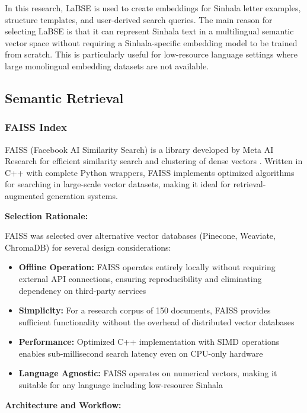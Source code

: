 \documentclass[12pt]{uomthesis}
\begin{document}
In this research, LaBSE is used to create embeddings for Sinhala letter examples, structure templates, and user-derived search queries. The main reason for selecting LaBSE is that it can represent Sinhala text in a multilingual semantic vector space without requiring a Sinhala-specific embedding model to be trained from scratch. This is particularly useful for low-resource language settings where large monolingual embedding datasets are not available.

\subsection{Semantic Retrieval}

\subsubsection{FAISS Index}

FAISS (Facebook AI Similarity Search) is a library developed by Meta AI Research for efficient similarity search and clustering of dense vectors \cite{johnson2019billion}. Written in C++ with complete Python wrappers, FAISS implements optimized algorithms for searching in large-scale vector datasets, making it ideal for retrieval-augmented generation systems.

\textbf{Selection Rationale:}

FAISS was selected over alternative vector databases (Pinecone, Weaviate, ChromaDB) \cite{pan2023vector} for several design considerations:

\begin{itemize}
    \item \textbf{Offline Operation:} FAISS operates entirely locally without requiring external API connections, ensuring reproducibility and eliminating dependency on third-party services
    \item \textbf{Simplicity:} For a research corpus of 150 documents, FAISS provides sufficient functionality without the overhead of distributed vector databases
    \item \textbf{Performance:} Optimized C++ implementation with SIMD operations enables sub-millisecond search latency even on CPU-only hardware
    \item \textbf{Language Agnostic:} FAISS operates on numerical vectors, making it suitable for any language including low-resource Sinhala
\end{itemize}

\textbf{Architecture and Workflow:}
\end{document}
